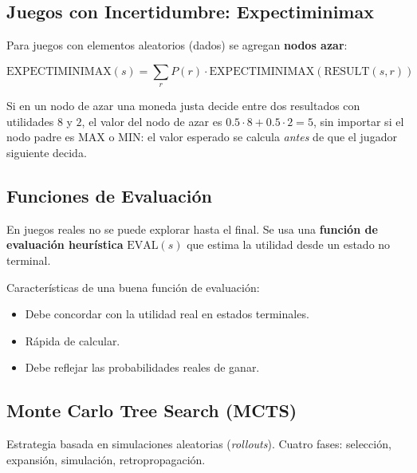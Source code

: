 \subsection{Juegos con Incertidumbre: Expectiminimax}

Para juegos con elementos aleatorios (dados) se agregan \textbf{nodos azar}:

$$\text{EXPECTIMINIMAX}(s) = \sum_r P(r) \cdot \text{EXPECTIMINIMAX}(\text{RESULT}(s, r))$$

\begin{example}
    Si en un nodo de azar una moneda justa decide entre dos resultados con utilidades $8$ y $2$, el valor del nodo de
    azar es $0.5 \cdot 8 + 0.5 \cdot 2 = 5$, sin importar si el nodo padre es MAX o MIN: el valor esperado se calcula
    \textit{antes} de que el jugador siguiente decida.
\end{example}

\subsection{Funciones de Evaluación}

En juegos reales no se puede explorar hasta el final. Se usa una \textbf{función de evaluación heurística} $\text{EVAL}(s)$ que estima la utilidad desde un estado no terminal.

Características de una buena función de evaluación:
\begin{itemize}
    \item Debe concordar con la utilidad real en estados terminales.
    \item Rápida de calcular.
    \item Debe reflejar las probabilidades reales de ganar.
\end{itemize}

\subsection{Monte Carlo Tree Search (MCTS)}

Estrategia basada en simulaciones aleatorias (\textit{rollouts}). Cuatro fases: selección, expansión, simulación, retropropagación.
